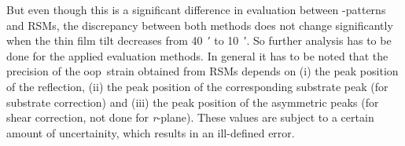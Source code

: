But even though this is a significant difference in evaluation between \thetaomega-patterns and \glspl{RSM}, the discrepancy between both methods does not change significantly when the thin film tilt decreases from \qty{40}{\arcminute} to \qty{10}{\arcminute}.
So further analysis has to be done for the applied evaluation methods.
In general it has to be noted that the precision of the \gls{oop}\ strain obtained from \glspl{RSM} depends on (i) the peak position of the reflection, (ii) the peak position of the corresponding substrate peak (for substrate correction) and (iii) the peak position of the asymmetric peaks (for shear correction, not done for \textit{r}-plane).
These values are subject to a certain amount of uncertainity, which results in an ill-defined error.

